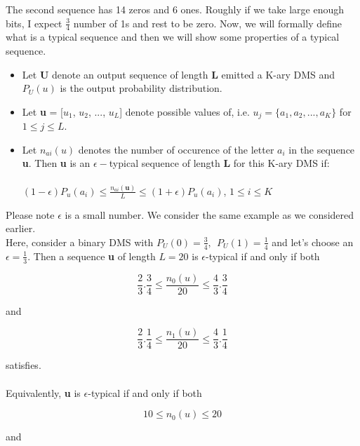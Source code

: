 \documentclass[11pt]{article}
\begin{document}
The second sequence has 14 zeros and 6 ones. Roughly if we take large enough bits, I expect $\frac{3}{4}$ number of 1s and rest to be zero. Now, we will formally define what is a typical sequence and then we will show some properties of a typical sequence.

\begin{itemize}
\item Let \textbf{U} denote an output sequence of length \textbf{L} emitted a K-ary DMS and $P_{U}(u)$ is the output probability distribution.
\item Let \textbf{u} = [$u_{1}$, $u_{2}$, ..., $u_{L}$] denote possible values of, i.e. $u_{j} = \{{a_{1}, a_{2}, ..., a_{K}}\}$ for $1 \leq j \leq L$.
\item Let $n_{ai}(u)$ denotes the number of occurence of the letter $a_{i}$ in the sequence \textbf{u}. Then \textbf{u} is an $\epsilon-$typical sequence of length \textbf{L} for this K-ary DMS if: \\ \\
$(1 - \epsilon)P_{u}(a_{i}) \leq \frac{n_{ai}(\textbf{u})}{L} \leq (1 + \epsilon) P_{u}(a_{i})$, $1 \leq i \leq K$
\end{itemize}
Please note $\epsilon$ is a small number. We consider the same example as we considered earlier.
\\

Here, consider a binary DMS with $P_{U}(0) = \frac{3}{4},\:\: P_{U}(1) = \frac{1}{4}$ and let's choose an $\epsilon = \frac{1}{3}$. Then a sequence \textbf{u} of length $L = 20$ is $\epsilon$-typical if and only if both

\begin{equation}
\frac{2}{3}.\frac{3}{4} \leq \frac{n_{0}(u)}{20} \leq \frac{4}{3}.\frac{3}{4}
\end{equation}

and

\begin{equation}
\frac{2}{3}.\frac{1}{4} \leq \frac{n_{1}(u)}{20} \leq \frac{4}{3}.\frac{1}{4}
\end{equation}

satisfies. 
\\ \\
Equivalently, \textbf{u} is $\epsilon$-typical if and only if both

\begin{equation}
10 \leq n_{0}(u) \leq 20
\end{equation}

and
\end{document}
